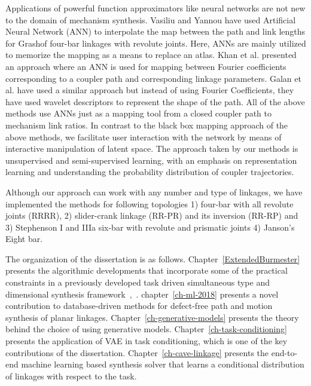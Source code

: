 Applications of powerful function approximators like neural networks are not new to the domain of mechanism synthesis. Vasiliu and Yannou \cite{vasiliu2001} have used Artificial Neural Network (ANN) to interpolate the map between the path and link lengths for Grashof four-bar linkages with revolute joints.
Here, ANNs are mainly utilized to memorize the mapping as a means to replace an atlas.
Khan et al.\cite{khan2015} presented an approach where an ANN is used for mapping between Fourier coefficients corresponding to a coupler path and corresponding linkage parameters.
Galan et al.\cite{galan2009} have used a similar approach but instead of using Fourier Coefficients, they have used wavelet descriptors to represent the shape of the path.
All of the above methods use ANNs just as a mapping tool from a closed coupler path to mechanism link ratios.
In contrast to the black box mapping approach of the above methods, we facilitate user interaction with the network by means of interactive manipulation of latent space.
The approach taken by our methods is unsupervised and semi-supervised learning, with an emphasis on representation learning and understanding the probability distribution of coupler trajectories.

Although our approach can work with any number and type of linkages, we have implemented the methods for following topologies 1) four-bar with all revolute joints (RRRR), 2) slider-crank linkage (RR-PR) and its inversion (RR-RP) and 3) Stephenson I and IIIa six-bar with revolute and prismatic joints 4) Janson's Eight bar. 

The organization of the dissertation is as follows. 
Chapter~\ref{ExtendedBurmester} presents the algorithmic developments that incorporate some of the practical constraints in a previously developed task driven simultaneous type and dimensional synthesis framework~\cite{ge2012novel},~\cite{sixbarJMR}. chapter~\ref{ch-ml-2018} presents a novel contribution to database-driven methods for defect-free path and motion synthesis of planar linkages. Chapter~\ref{ch-generative-models} presents the theory behind the choice of using generative models. Chapter~\ref{ch-task-conditioning} presents the application of VAE in task conditioning, which is one of the key contributions of the dissertation. Chapter~\ref{ch-cave-linkage} presents the end-to-end machine learning based synthesis solver that learns a conditional distribution of linkages with respect to the task.  
